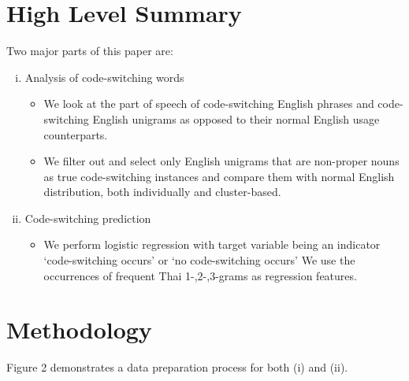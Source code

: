 \documentclass[conference]{IEEEtran}
\newcommand{\col}[1]{\textcolor{awesome}{#1}}
\begin{document}
\section{High Level Summary}
Two major parts of this paper are:
\begin{enumerate}[(i)]
\item Analysis of code-switching words
\begin{itemize}
\item We look at the part of speech of code-switching English phrases and code-switching English unigrams as opposed to their normal English usage counterparts. 
\item We filter out and select only English unigrams that are non-proper nouns as true code-switching instances and compare them with normal English distribution, both individually and cluster-based. 
\end{itemize}
\item Code-switching prediction
\begin{itemize}
\item We perform logistic regression with target variable being an indicator `code-switching occurs' or `no code-switching occurs'%
We use the occurrences of frequent Thai 1-,2-,3-grams as regression features.
\end{itemize}
\end{enumerate}


\section{Methodology}
Figure 2 demonstrates a data preparation process for both (i) and (ii).  \smallskip
\end{document}

